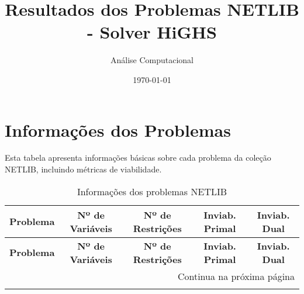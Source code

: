 \documentclass[12pt]{article}
\title{Resultados dos Problemas NETLIB - Solver HiGHS}
\author{Análise Computacional}
\date{\today}
\begin{document}
\maketitle

\section{Informações dos Problemas}

Esta tabela apresenta informações básicas sobre cada problema da coleção NETLIB, incluindo métricas de viabilidade.

\scriptsize
\begin{longtable}{@{}l|cccc@{}}
\caption{Informações dos problemas NETLIB} \label{tab:info_problemas} \\
\toprule
\textbf{Problema} & \textbf{Nº de Variáveis} & \textbf{Nº de Restrições} & \textbf{Inviab. Primal} & \textbf{Inviab. Dual} \\
\midrule
\endfirsthead

\toprule
\textbf{Problema} & \textbf{Nº de Variáveis} & \textbf{Nº de Restrições} & \textbf{Inviab. Primal} & \textbf{Inviab. Dual} \\
\midrule
\endhead

\midrule \multicolumn{5}{r}{{Continua na próxima página}} \\ \midrule
\endfoot


\end{longtable}
\end{document}

